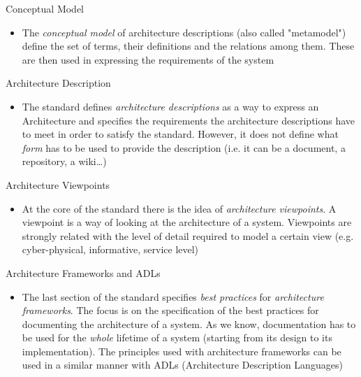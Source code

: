 		\begin{frame}
			
		\vspace{0.3cm}
		
			\begin{block}{Conceptual Model}
				\begin{itemize}
					\item The \emph{conceptual model} of architecture descriptions (also called "metamodel") define the set of terms, their definitions and the relations among them. These are then used in expressing the requirements of the system
				\end{itemize}
			\end{block}				
			
\vspace{0.3cm}			
			
			\begin{block}{Architecture Description}
				\begin{itemize}
					\item The standard defines \emph{architecture descriptions} as a way to express an Architecture and specifies the requirements the architecture descriptions have to meet in order to satisfy the standard. However, it does not define what \emph{form} has to be used to provide the description (i.e. it can be a document, a repository, a wiki\dots)
				\end{itemize}
			\end{block}
		\end{frame}
		
		\begin{frame}					
			
			\begin{block}{Architecture Viewpoints}
			\begin{itemize}
				\item At the core of the standard there is the idea of \emph{architecture viewpoints}. A viewpoint is a way of looking at the architecture of a system. Viewpoints are strongly related with the level of detail required to model a certain view (e.g. cyber-physical, informative, service level)
				\end{itemize}
			\end{block}
				
			\begin{block}{Architecture Frameworks and ADLs}
				\begin{itemize}
					\item The last section of the standard specifies \emph{best practices} for \emph{architecture frameworks}.\newline
					The focus is on the specification of the best practices for documenting the architecture of a system. As we know, documentation has to be used for the \emph{whole} lifetime of a system (starting from its design to its implementation).\newline
					The principles used with architecture frameworks can be used in a similar manner with ADLs (Architecture Description Languages)
				\end{itemize}
			
			\end{block}
		\end{frame}
		
